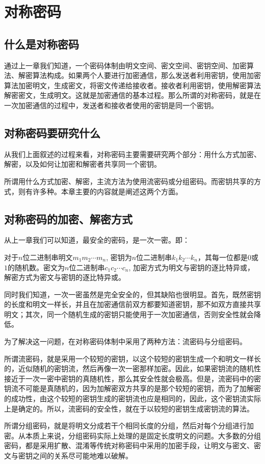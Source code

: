 \chapter{对称密码}
\section{什么是对称密码}
通过上一章我们知道，一个密码体制由明文空间、密文空间、密钥空间、加密算法、解密算法构成。如果两个人要进行加密通信，那么发送者利用密钥，使用加密算法加密明文，生成密文，将密文传递给接收者。接收者利用密钥，使用解密算法解密密文，生成明文。这就是加密通信的基本过程。那么所谓的对称密码，就是在一次加密通信的过程中，发送者和接收者使用的密钥是同一个密钥。
\section{对称密码要研究什么}
从我们上面叙述的过程来看，对称密码主要需要研究两个部分：用什么方式加密、解密，以及如何让加密和解密者共享同一个密钥。\par
所谓用什么方式加密、解密，主流方法为使用流密码或分组密码。而密钥共享的方式，则有许多种。本章主要的内容就是阐述这两个方面。
\section{对称密码的加密、解密方式}
从上一章我们可以知道，最安全的密码，是一次一密。即：\par
对于$n$位二进制串明文$m_1m_2\cdots m_n$, 密钥为$n$位二进制串$k_1k_2\cdots k_n$，其每一位都是$0$或$1$的随机数。密文为$n$位二进制串$c_1c_2\cdots c_n$, 加密方式为明文与密钥的逐比特异或，解密方式为密文与密钥的逐比特异或。\par
同时我们知道，一次一密虽然是完全安全的，但其缺陷也很明显。首先，既然密钥的长度和明文一样长，并且在加密通信前双方都要知道密钥，那不如双方直接共享明文；其次，同一个随机生成的密钥只能使用于一次加密通信，否则安全性就会降低。\par
为了解决这一问题，在对称密码体制中采用了两种方法：流密码与分组密码。\par
所谓流密码，就是采用一个较短的密钥，以这个较短的密钥生成一个和明文一样长的，近似随机的密钥流，然后再像一次一密那样加密。因此，如果密钥流的随机性接近于一次一密中密钥的真随机性，那么其安全性就会极高。但是，流密码中的密钥流不可能是真随机的，因为加解密双方共享的是那个较短的密钥，而为了加解密的成功性，由这个较短的密钥生成的密钥流也应是相同的，因此，这个密钥流实际上是确定的。所以，流密码的安全性，就在于以较短的密钥生成密钥流的算法。\par
所谓分组密码，就是将明文分成若干个相同长度的分组，然后对每个分组进行加密。从本质上来说，分组密码实际上处理的是固定长度明文的问题。大多数的分组密码，都是采用扩散、混淆等传统对称密码中采用的加密手段，让明文与密文、密文与密钥之间的关系尽可能地难以破解。
